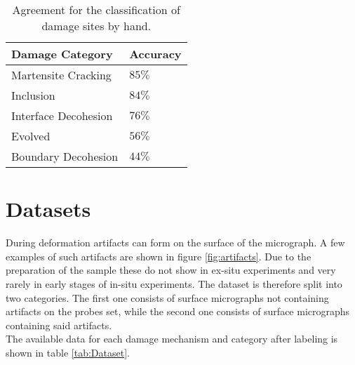 \begin{table}[H]
 \begin{center}
  \begin{tabular}{@{} *2l @{}} \toprule[2pt]
   Damage Category & Accuracy \\\midrule
   Martensite Cracking & $85 \%$   \\ 
   Inclusion  & $84 \%$ \\ 
   Interface Decohesion  & $76 \% $ \\
   Evolved & $56\%$ \\
   Boundary Decohesion & $44 \%$ \\ \bottomrule[2pt]

  \end{tabular}
 \end{center}
 \caption{Agreement for the classification of damage sites by hand. }
 \label{tab:Reliability}
\end{table}


\section{Datasets}
During deformation artifacts can form on the surface of the micrograph. A few examples of such artifacts are shown in figure \ref{fig:artifacts}. Due to the preparation of the sample these do not show in ex-situ experiments and very rarely in early stages of in-situ experiments. The dataset is therefore split into two categories. The first one consists of surface micrographs not containing artifacts on the probes set, while the second one consists of surface micrographs containing said artifacts. \\

The available data for each damage mechanism and category after labeling is shown in table \ref{tab:Dataset}.


